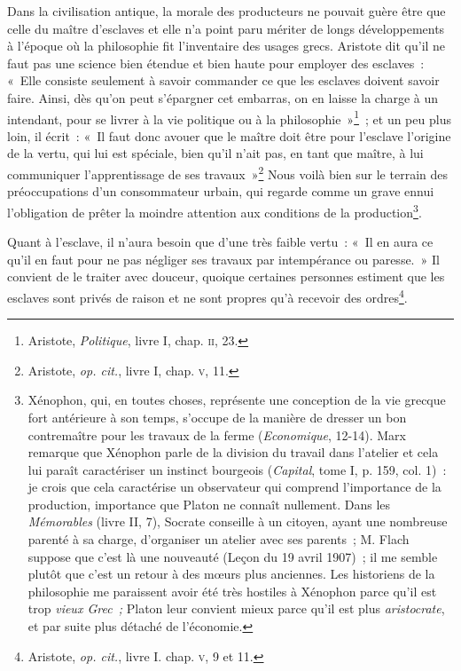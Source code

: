 \documentclass[french,twoside]{book} %
\begin{document}
Dans la civilisation antique, la morale des producteurs ne pouvait guère être que celle du maître d’esclaves et elle n’a point paru mériter de longs développements à l’époque où la philosophie fit l’inventaire des usages grecs. Aristote dit qu’il ne faut pas une science bien étendue et bien haute pour employer des esclaves : « Elle consiste seulement à savoir commander ce que les esclaves doivent savoir faire. Ainsi, dès qu’on peut s’épargner cet embarras, on en laisse la charge à un intendant, pour se livrer à la vie politique ou à la philosophie »\footnote{ \noindent Aristote, \emph{Politique}, livre I, chap. {\scshape ii}, 23.
 } ; et un peu plus loin, il écrit : « Il faut donc avouer que le maître doit être pour l’esclave l’origine de la vertu, qui lui est spéciale, bien qu’il n’ait pas, en tant que maître, à lui communiquer l’apprentissage de ses travaux »\footnote{ \noindent Aristote, \emph{op. cit.}, livre I, chap. {\scshape v}, 11.
 } Nous  voilà bien sur le terrain des préoccupations d’un consommateur urbain, qui regarde comme un grave ennui l’obligation de prêter la moindre attention aux conditions de la production\footnote{ \noindent Xénophon, qui, en toutes choses, représente une conception de la vie grecque fort antérieure à son temps, s’occupe de la manière de dresser un bon contremaître pour les travaux de la ferme (\emph{Economique}, 12-14). Marx remarque que Xénophon parle de la division du travail dans l’atelier et cela lui paraît caractériser un instinct bourgeois (\emph{Capital}, tome I, p. 159, col. 1) : je crois que cela caractérise un observateur qui comprend l’importance de la production, importance que Platon ne connaît nullement. Dans les \emph{Mémorables} (livre II, 7), Socrate conseille à un citoyen, ayant une nombreuse parenté à sa charge, d’organiser un atelier avec ses parents ; M. Flach suppose que c’est là une nouveauté (Leçon du 19 avril 1907) ; il me semble plutôt que c’est un retour à des mœurs plus anciennes. Les historiens de la philosophie me paraissent avoir été très hostiles à Xénophon parce qu’il est trop \emph{vieux Grec ;} Platon leur convient mieux parce qu’il est plus \emph{aristocrate}, et par suite plus détaché de l’économie.
 }.\par
Quant à l’esclave, il n’aura besoin que d’une très faible vertu : « Il en aura ce qu’il en faut pour ne pas négliger ses travaux par intempérance ou paresse. » Il convient de le traiter avec douceur, quoique certaines personnes estiment que les esclaves sont privés de raison et ne sont propres qu’à recevoir des ordres\footnote{ \noindent Aristote, \emph{op. cit.}, livre I. chap. {\scshape v}, 9 et 11.
 }.\par
\end{document}
